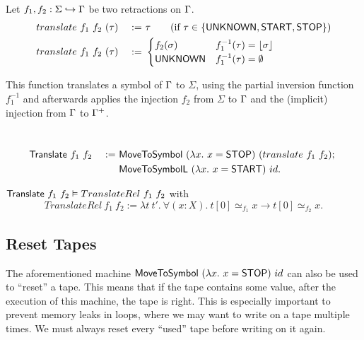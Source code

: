\begin{definition}
  \label{def:translate}
  Let $f_1, f_2 : \Sigma \hookrightarrow \Gamma$ be two retractions on $\Gamma$.
  \begin{alignat*}{2}
    & translate~f_1~f_2~(\tau) &~:=~& \tau \qquad\text{(if $\tau \in \{\mathsf{UNKNOWN}, \mathsf{START}, \mathsf{STOP}\}$)} \\
    & translate~f_1~f_2~(\tau) &~:=~&
    \begin{cases}
      f_2(\sigma)  & f_1^{-1}(\tau) = \left\lfloor {\sigma} \right\rfloor \\
      \mathsf{UNKNOWN} & f_1^{-1}(\tau) = \emptyset
    \end{cases}
  \end{alignat*}
\end{definition}

This function translates a symbol of $\Gamma$ to $\Sigma$, using the partial inversion function $f_1^{-1}$ and afterwards applies the injection $f_2$
from $\Sigma$ to $\Gamma$ and the (implicit) injection from $\Gamma$ to $\Gamma^+$.

\begin{definition}[$\MS{Translate}$][Translate]
  ~
  \begin{alignat*}{2}
    & \mathsf{Translate}~f_1~f_2 &~:=~& \mathsf{MoveToSymbol}~(\lambda x.~x=\mathsf{STOP})~(translate~f_1~f_2) ;~ \\
    &                        &~  ~& \mathsf{MoveToSymbolL}~(\lambda x.~x=\mathsf{START})~id.
  \end{alignat*}
\end{definition}

\begin{lemma}
  $\mathsf{Translate}~f_1~f_2 \mathrel{\vDash} TranslateRel~f_1~f_2$ with
  \[
    TranslateRel~f_1~f_2 := \lambda t~t'.~\forall(x:X).~t[0] \simeq_{f_1} x \rightarrow t[0] \simeq_{f_2} x.
  \]
\end{lemma}


\subsection{Reset Tapes}
\label{sec:reset-tape}

The aforementioned machine $\mathsf{MoveToSymbol}~(\lambda x.~x=\mathsf{STOP})~id$ can also be used to ``reset'' a tape.  This means that if the tape contains
some value, after the execution of this machine, the tape is right.  This is especially important to prevent memory leaks in loops, where we may want
to write on a tape multiple times.  We must always reset every ``used'' tape before writing on it again.

